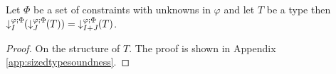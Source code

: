 \begin{lemma}\label{lemma:addsusume}
Let $\Phi$ be a set of constraints with unknowns in $\varphi$ and let $T$ be a type then $\susume{\susume{T}{\varphi}{\Phi}{J}}{\varphi}{\Phi}{I} =\; \susume{T}{\varphi}{\Phi}{I+J}$.
 \begin{proof} On the structure of $T$. The proof is shown in Appendix \ref{app:sizedtypesoundness}.

\end{proof}
\end{lemma}
